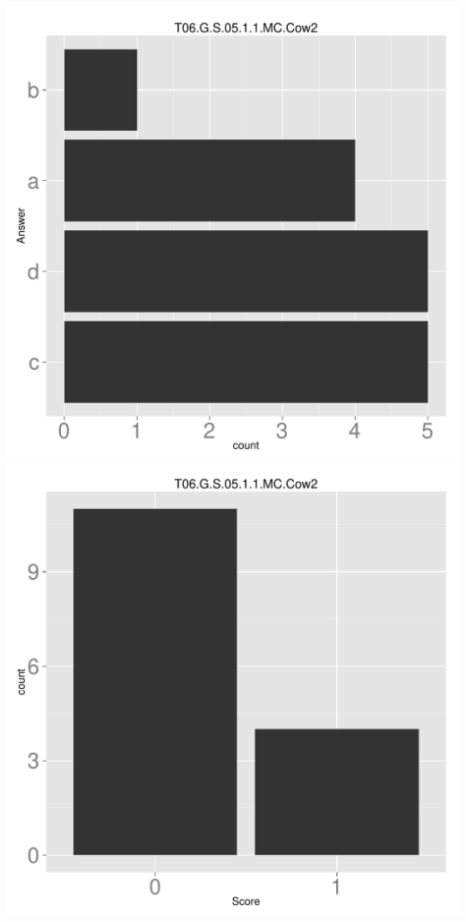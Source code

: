 \documentclass[12pt,nohyper]{tufte-handout}\usepackage[]{graphicx}\usepackage[]{color}
\begin{document}
\begin{center} \includegraphics[width=.45\linewidth]{Topic06_79_answer} \includegraphics[width=.45\linewidth]{Topic06_79_score} \end{center} 
\end{document}

